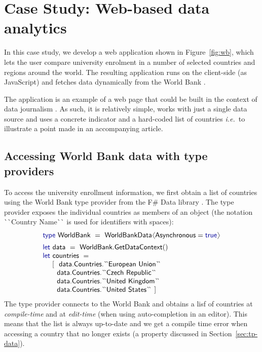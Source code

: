 \documentclass[submission,copyright,creativecommons]{eptcs}
\newcommand{\langl}{\begin{picture}(4.5,7)
\put(1.1,2.5){\rotatebox{60}{\line(1,0){5.5}}}
\put(1.1,2.5){\rotatebox{300}{\line(1,0){5.5}}}
\end{picture}}
\newcommand{\rangl}{\begin{picture}(4.5,7)
\put(.9,2.5){\rotatebox{120}{\line(1,0){5.5}}}
\put(.9,2.5){\rotatebox{240}{\line(1,0){5.5}}}
\end{picture}}
\newcommand{\kvd}[1]{\textnormal{\textcolor{kvdclr}{\sffamily #1}}}
\newcommand{\ident}[1]{\textnormal{\sffamily #1}}
\newcommand{\lident}[1]{\textnormal{\sffamily 
  \`{}\hspace{-0.25em}\`{}\hspace{-0.1em}#1\`{}\hspace{-0.25em}\`{}}}
\begin{document}
\section{Case Study: Web-based data analytics}
\label{sec:case}
In this case study, we develop a web application shown in Figure~\ref{fig:wb}, which lets the
user compare university enrolment in a number of selected countries and regions around the world. 
The resulting application runs on the client-side (as JavaScript) and fetches data dynamically 
from the World Bank \cite{data-wb-schter}.

The application is an example of a web page that could be built in the context of data journalism 
\cite{dj-handbook}. As such, it is relatively simple, works with just a single data source and 
uses a concrete indicator and a hard-coded list of countries \emph{i.e.}~to illustrate a point 
made in an accompanying article.


\subsection{Accessing World Bank data with type providers}

To access the university enrollment information, we first obtain a list of countries using the 
World Bank type provider from the F\# Data library \cite{fsharp-data}. The type provider exposes 
the individual countries as members of an object (the notation \lident{Country Name} is used for 
identifiers with spaces):
%
\begin{equation*}
\begin{array}{l}
 \kvd{type}~\ident{WorldBank}~=~\ident{WorldBankData}\langl\ident{Asynchronous}=\kvd{true}\rangl
 \\[0.5em]
 \kvd{let}~\ident{data}~=~\ident{WorldBank.GetDataContext}() \\
 \kvd{let}~\ident{countries}~= \\
 \quad~\lbrack~~ \ident{data.Countries.}\lident{European Union} \\
 \qquad   \ident{data.Countries.}\lident{Czech Republic} \\
 \qquad   \ident{data.Countries.}\lident{United Kingdom} \\
 \qquad   \ident{data.Countries.}\lident{United States} ~\rbrack 
\end{array}
\end{equation*}
%
The type provider connects to the World Bank and obtains a lisf of countries at 
\emph{compile-time} and at \emph{edit-time} (when using auto-completion in an editor).
This means that the list is always up-to-date and we get a compile time error when accessing 
a country that no longer exists (a property discussed in Section~\ref{sec:tp-data}).
\end{document}
